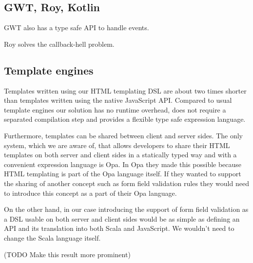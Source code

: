 \documentclass[american,english,runningheads]{llncs}
\begin{document}
\subsection{GWT, Roy, Kotlin}

GWT also has a type safe API to handle events.

Roy solves the callback-hell problem.

\subsection{Template engines}

Templates written using our HTML templating DSL are about two times shorter than templates written using the native JavaScript API. Compared to usual template engines our solution has no runtime overhead, does not require a separated compilation step and provides a flexible type safe expression language.

Furthermore, templates can be shared between client and server sides. The only system, which we are aware of, that allows developers to share their HTML templates on both server and client sides in a statically typed way and with a convenient expression language is Opa. In Opa they made this possible because HTML templating is part of the Opa language itself. If they wanted to support the sharing of another concept such as form field validation rules they would need to introduce this concept as a part of their Opa language.

On the other hand, in our case introducing the support of form field validation as a DSL usable on both server and client sides would be as simple as defining an API and its translation into both Scala and JavaScript. We wouldn’t need to change the Scala language itself.

(TODO Make this result more prominent)
\end{document}
